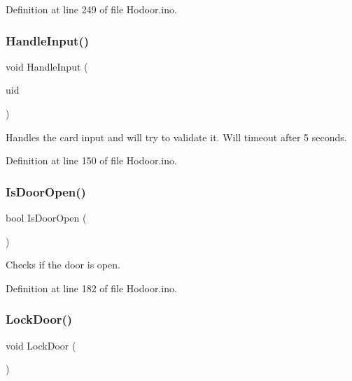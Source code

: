 Definition at line 249 of file Hodoor.\+ino.

\mbox{\label{_hodoor_8ino_a98675754ce81a9e1a94fa2835d88d9d3}} 
\subsubsection{\texorpdfstring{Handle\+Input()}{HandleInput()}}
{\footnotesize\ttfamily void Handle\+Input (\begin{DoxyParamCaption}\item[{M\+F\+R\+C522\+::\+Uid $\ast$}]{uid }\end{DoxyParamCaption})}

Handles the card input and will try to validate it. Will timeout after 5 seconds. 

Definition at line 150 of file Hodoor.\+ino.

\mbox{\label{_hodoor_8ino_afbe526681d5cfb592beb5df86c387c56}} 
\subsubsection{\texorpdfstring{Is\+Door\+Open()}{IsDoorOpen()}}
{\footnotesize\ttfamily bool Is\+Door\+Open (\begin{DoxyParamCaption}{ }\end{DoxyParamCaption})}



Checks if the door is open. 



Definition at line 182 of file Hodoor.\+ino.

\mbox{\label{_hodoor_8ino_a01c01d3be09b769c607eb96c37d300d3}} 
\subsubsection{\texorpdfstring{Lock\+Door()}{LockDoor()}}
{\footnotesize\ttfamily void Lock\+Door (\begin{DoxyParamCaption}{ }\end{DoxyParamCaption})}



